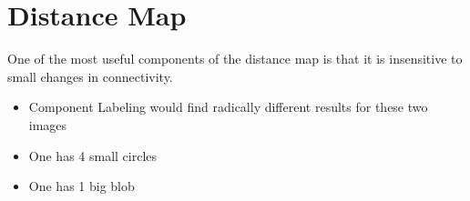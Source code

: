\documentclass[letterpaper,10pt,english]{sphinxmanual}
\begin{document}
\begin{sphinxVerbatim}[commandchars=\\\{\}]
              
\end{sphinxVerbatim}

\noindent{}


\section{Distance Map}
\label{\detokenize{06-AdvancedShapeAndTexture:distance-map}}
\sphinxAtStartPar
One of the most useful components of the distance map is that it is  insensitive to small changes in connectivity.
\begin{itemize}
\item {} 
\sphinxAtStartPar
Component Labeling would find radically different results for these two images

\item {} 
\sphinxAtStartPar
One has 4 small circles

\item {} 
\sphinxAtStartPar
One has 1 big blob

\end{itemize}
\end{document}
